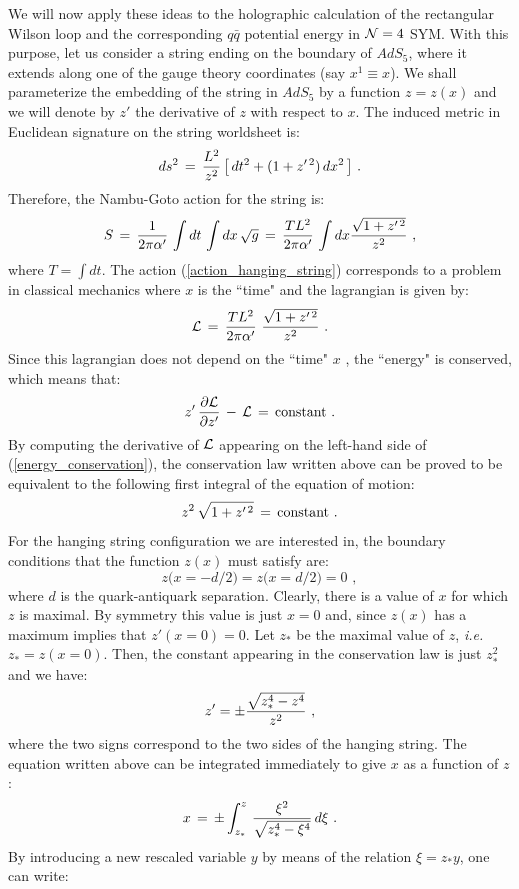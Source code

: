 \documentclass[12pt,notitlepage]{article}
\newcommand{\beq}{\begin{equation}}
\newcommand{\eeq}{\end{equation}}
\def\ie{{\emph{i.e.}}}
\begin{document}
We will now apply these ideas to the holographic calculation of the rectangular Wilson loop and the corresponding $q\bar q$ potential energy in ${\cal N}=4$ SYM. With this purpose, 
let us consider a string ending on the boundary of $AdS_5$, where it extends along one of the gauge theory coordinates (say $x^1\equiv x$). 
We shall parameterize the embedding of the string in $AdS_5$ by a function $z=z(x)$ and we will denote by $z'$ the derivative of $z$ with respect to $x$. 
The induced metric in Euclidean signature on the string worldsheet is:
\beq
ds^2\,=\, {L^2\over z^2}\,\big[\,dt^2+(1+z'^{\,2})\,dx^2\,\big]\,\,.
\eeq
Therefore, the Nambu-Goto action for the string is:
\beq
S\,=\,{1\over 2\pi\alpha'}\,\int dt\,\int dx\,\sqrt{g}\,=\,
{T L^2\over 2\pi\alpha'}\,\int dx 
{\sqrt{1+z'^{\,2}}\over z^2}\,\,,
\label{action_hanging_string}
\eeq
where $T=\int dt$. The action (\ref{action_hanging_string}) corresponds to a problem in classical mechanics where $x$ is the ``time"  and the  lagrangian is given by:
\beq
{\cal L}\,=\,{T L^2\over 2\pi\alpha'} \,\,
{\sqrt{1+z'^{\,2}}\over z^2}\,\,.
\eeq
Since this lagrangian does not depend on the  ``time" $x$ , the ``energy" is conserved, which means that: 
\beq
z'\,{\partial {\cal L}\over \partial z'}\,-\,{\cal L}\,=\,{\rm constant}\,\,.
\label{energy_conservation}
\eeq
By computing the derivative of ${\cal L}$ appearing on the left-hand side of (\ref{energy_conservation}), the conservation law written above can be proved to be equivalent to the following first integral of the equation of motion:
\beq
 z^2\,\sqrt{1+z'^{\,2}}\,=\,{\rm constant}\,\,.
 \label{first_integral}
 \eeq
For the hanging string configuration we are interested in, the boundary conditions that the function $z(x)$ must satisfy are:
\beq
z\big(x=-d/2\big)=z\big(x=d/2\big)=0\,\,,
\label{bc_hanging_string}
\eeq
where $d$ is the quark-antiquark separation. 
Clearly, there is a value of $x$ for which $z$ is maximal. By symmetry this value is just 
$x=0$ and, since $z(x)$ has a maximum implies that  $z'(x=0)=0$. Let $z_*$ be the maximal value of $z$, \ie\ $z_*=z(x=0)$. Then, the constant appearing in the conservation law is just $z_*^2$ and we have:
\beq
z'=\pm {\sqrt{z_*^4-z^4}\over z^2}\,\,,
\label{zprime_hanging_string}
\eeq
where the two signs correspond to the two sides of the hanging string. The equation written above can be integrated immediately to give $x$ as a function of $z$:
\beq
x\,=\,\pm \int_{z_*}^{z}\,{\xi^2\over \sqrt{z_*^4-\xi^4}}\,d\xi\,\,.
\eeq
By introducing a new rescaled variable $y$ by means of the relation $\xi=z_* y$, one can write:
\end{document}
